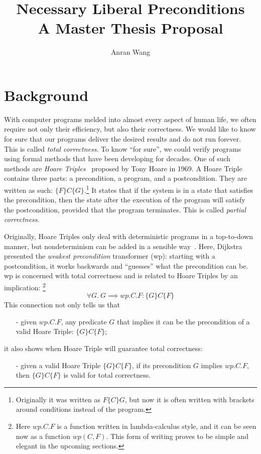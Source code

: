 \documentclass[adraft,hidelinks]{eptcs}
\begin{document}
\def\titlerunning{Proposal}
\def\authorrunning{Anran Wang}
\title{\Large Necessary Liberal Preconditions \\\normalsize A Master Thesis Proposal}
\author{Anran Wang}
\maketitle


%
\section{Background}\label{sec:background}

With computer programs melded into almost every aspect of human life, we often require not only their efficiency, but also their correctness. 
We would like to know for sure that our programs deliver the desired results and do not run forever. 
This is called \textit{total correctness}. 
To know ``for sure'', we could verify programs using formal methods that have been developing for decades. 
One of such methods are \textit{Hoare Triples}~\cite{Hoare1969} proposed by Tony Hoare in 1969. 
A Hoare Triple contains three parts: a precondition, a program, and a postcondition. 
They are written as such: $\{F\}C\{G\}$.\footnote{Originally it was written as $F \{C\} G$, but now it is often written with brackets around conditions instead of the program.} 
It states that if the system is in a state that satisfies the precondition, then the state after the execution of the program will satisfy the postcondition, provided that the program terminates.
This is called \textit{partial correctness}. 

Originally, Hoare Triples only deal with deterministic programs in a top-to-down manner, but nondeterminism can be added in a sensible way~\cite{Dijkstra1975}. 
Here, Dijkstra presented the \textit{weakest precondition} transformer (wp): starting with a postcondition, it works backwards and ``guesses'' what the precondition can be. 
wp is concerned with total correctness and is related to Hoare Triples by an implication: 
\footnote{Here $wp.C.F$ is a function written in lambda-calculus style, and it can be seen now as a function $wp(C,F)$. This form of writing proves to be simple and elegant in the upcoming sections.}
\[\forall G.\ G\implies wp.C.F: \{G\} C \{F\}\]
This connection not only tells us that 
\begin{itemize}
    \item[-] given $wp.C.F$, any predicate $G$ that implies it can be the precondition of a valid Hoare Triple: $\{G\} C \{F\}$; 
\end{itemize}
it also shows when Hoare Triple will guarantee total correctness: 
\begin{itemize}
    \item[-] given a valid Hoare Triple $\{G\} C \{F\}$, if its precondition $G$ implies $wp.C.F$, then $\{G\} C \{F\}$ is valid for total correctness. 
\end{itemize}
\end{document}
